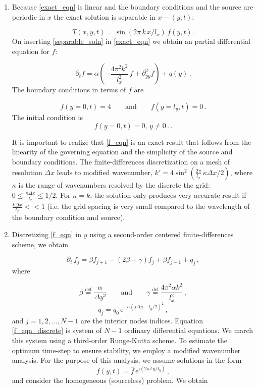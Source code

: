 \documentclass[11pt]{article}
\newcommand{\defn}{\stackrel{\text{def}}{=}}
\newcommand{\ii}{\mathrm{i}}
\newcommand{\ee}{\mathrm{e}}
\newcommand{\com}{\, ,}
\newcommand{\per}{\, .}
\def\beq{\begin{equation}}
\def\eeq{\end{equation}}
\begin{document}
\begin{enumerate}[label=(\alph*)]
    \item Because \eqref{exact_eqn} is linear and the  boundary conditions and the source are periodic in $x$ the exact solution is separable in $x-(y,t)$:

        \beq
        \label{separable_soln}
        T(x,y,t) = \sin\left(2\pi\,k\,x/l_x\right)\,f(y,t).
        \eeq
        On inserting \eqref{separable_soln} in \eqref{exact_eqn} we obtain an partial differential equation for $f$:

        \beq
        \label{f_eqn}
    \partial_t f = \alpha\left(-\frac{4\pi^2k^2}{l_x^2}\,f + \partial^2_{yy}f\right) + q(y)\per
        \eeq
        The boundary conditions in terms of $f$ are

        \beq
            f(y=0,t) = 4\qquad \text{and}\qquad f(y=l_y,t) = 0\per
        \eeq
        The initial condition is
        \beq
            f(y=0,t) = 0, \,y\neq0\per\per
        \eeq



        It is important to realize that \eqref{f_eqn} is an exact result that follows from the linearity of the governing equation and the simplicity of the source and boundary conditions. The finite-differences discretization on a mesh of resolution $\Delta x$ leads to modified wavenumber, $k'= 4\sin^2\left(\tfrac{2\pi}{l_x}\,\kappa\Delta x/2\right)$, where $\kappa$ is the range of wavenumbers resolved by the discrete the grid: $0\leq\tfrac{\kappa\Delta x}{l_x}\leq 1/2$. For $\kappa = k$, the solution only produces very accurate result if $\tfrac{k\Delta x}{l_x}<<1$ (i.e. the grid spacing is very small compared to the wavelength of the boundary condition and source).

    \item Discretizing \eqref{f_eqn} in $y$ using a second-order centered finite-differences scheme, we obtain

        \beq
            \label{f_eqn_discrete}
            \partial_t\,f_j = \beta f_{j+1} - \left(2\beta + \gamma\right)f_j + \beta f_{j-1} + q_j\com
        \eeq
        where

        \beq
        \beta \defn \frac{\alpha}{\Delta y^2} \qquad\text{and}\qquad \gamma \defn \frac{4\pi^2\alpha k^2}{l_x^2}\com
        \eeq
        \beq
        q_j = q_0\,\ee^{-a(j\Delta y - l_y/2)^2}\com
        \eeq
        and $j=1,2,\ldots,N-1$ are the interior nodes indices. Equation \eqref{f_eqn_discrete} is system of $N-1$ ordinary differential equations. We march this system using a third-order Runge-Kutta scheme. To estimate the optimum time-step to ensure stability, we employ a modified wavenumber analysis. For the purpose of this analysis, we assume solutions in the form
        \beq
        f(y,t) = \hat{f}\,\ee^{\ii(2\pi\,l\,y/l_y)}\com
        \eeq
        and consider the homogeneous (sourceless) problem. We obtain


\end{enumerate}
\end{document}
